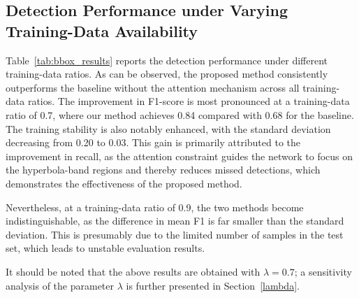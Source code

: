 \documentclass[lettersize,journal]{IEEEtran}
\begin{document}
\subsection{Detection Performance under Varying Training-Data Availability}


Table~\ref{tab:bbox_results} reports the detection performance under different training-data ratios. 
As can be observed, the proposed method consistently outperforms the baseline without the attention mechanism across all training-data ratios. 
The improvement in F1-score is most pronounced at a training-data ratio of 0.7, 
where our method achieves 0.84 compared with 0.68 for the baseline. 
The training stability is also notably enhanced, with the standard deviation decreasing from 0.20 to 0.03. 
This gain is primarily attributed to the improvement in recall, 
as the attention constraint guides the network to focus on the hyperbola-band regions and thereby reduces missed detections, 
which demonstrates the effectiveness of the proposed method.

Nevertheless, at a training-data ratio of 0.9, 
the two methods become indistinguishable, as the difference in mean F1 is far smaller than the standard deviation. 
This is presumably due to the limited number of samples in the test set, 
which leads to unstable evaluation results. 

It should be noted that the above results are obtained with $\lambda=0.7$; 
a sensitivity analysis of the parameter $\lambda$ is further presented in Section~\ref{lambda}.
\end{document}
